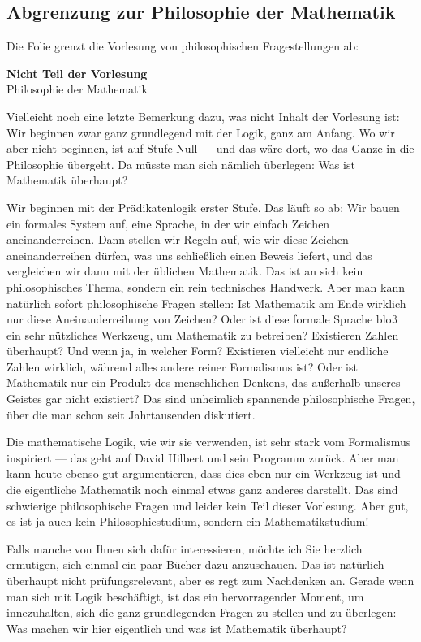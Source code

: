 \subsection{Abgrenzung zur Philosophie der Mathematik}

\begin{meta-note}
Die Folie grenzt die Vorlesung von philosophischen Fragestellungen ab:
\begin{center}
\textbf{Nicht Teil der Vorlesung} \\
Philosophie der Mathematik
\end{center}
\end{meta-note}

\begin{spoken-clean}[00:18:19 - 00:20:38]
Vielleicht noch eine letzte Bemerkung dazu, was nicht Inhalt der Vorlesung ist: Wir beginnen zwar ganz grundlegend mit der Logik, ganz am Anfang. Wo wir aber nicht beginnen, ist auf Stufe Null --- und das wäre dort, wo das Ganze in die Philosophie übergeht. Da müsste man sich nämlich überlegen: Was ist Mathematik überhaupt?

Wir beginnen mit der Prädikatenlogik erster Stufe. Das läuft so ab: Wir bauen ein formales System auf, eine Sprache, in der wir einfach Zeichen aneinanderreihen. Dann stellen wir Regeln auf, wie wir diese Zeichen aneinanderreihen dürfen, was uns schließlich einen Beweis liefert, und das vergleichen wir dann mit der üblichen Mathematik. Das ist an sich kein philosophisches Thema, sondern ein rein technisches Handwerk. Aber man kann natürlich sofort philosophische Fragen stellen: Ist Mathematik am Ende wirklich nur diese Aneinanderreihung von Zeichen? Oder ist diese formale Sprache bloß ein sehr nützliches Werkzeug, um Mathematik zu betreiben? Existieren Zahlen überhaupt? Und wenn ja, in welcher Form? Existieren vielleicht nur endliche Zahlen wirklich, während alles andere reiner Formalismus ist? Oder ist Mathematik nur ein Produkt des menschlichen Denkens, das außerhalb unseres Geistes gar nicht existiert? Das sind unheimlich spannende philosophische Fragen, über die man schon seit Jahrtausenden diskutiert.

Die mathematische Logik, wie wir sie verwenden, ist sehr stark vom Formalismus inspiriert --- das geht auf David Hilbert und sein Programm zurück. Aber man kann heute ebenso gut argumentieren, dass dies eben nur ein Werkzeug ist und die eigentliche Mathematik noch einmal etwas ganz anderes darstellt. Das sind schwierige philosophische Fragen und leider kein Teil dieser Vorlesung. Aber gut, es ist ja auch kein Philosophiestudium, sondern ein Mathematikstudium!

Falls manche von Ihnen sich dafür interessieren, möchte ich Sie herzlich ermutigen, sich einmal ein paar Bücher dazu anzuschauen. Das ist natürlich überhaupt nicht prüfungsrelevant, aber es regt zum Nachdenken an. Gerade wenn man sich mit Logik beschäftigt, ist das ein hervorragender Moment, um innezuhalten, sich die ganz grundlegenden Fragen zu stellen und zu überlegen: Was machen wir hier eigentlich und was ist Mathematik überhaupt?
\end{spoken-clean}

